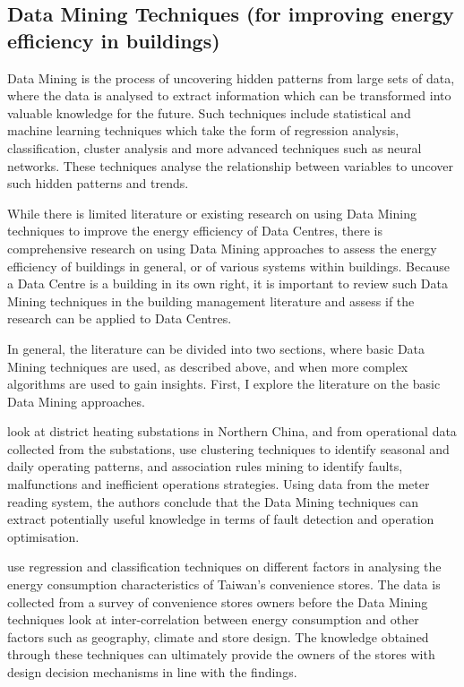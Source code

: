 \documentclass[12pt]{scrartcl}
\begin{document}
\subsection{Data Mining Techniques (for improving energy efficiency in buildings)}  
\label{subsec:[Data Mining Techniques]}
Data Mining is the process of uncovering hidden patterns from large sets of data, where the data is analysed to extract information which can be transformed into valuable knowledge for the future. Such techniques include statistical and machine learning techniques which take the form of regression analysis, classification, cluster analysis and more advanced techniques such as neural networks. These techniques analyse the relationship between variables to uncover such hidden patterns and trends.  

While there is limited literature or existing research on using Data Mining techniques to improve the energy efficiency of Data Centres, there is comprehensive research on using Data Mining approaches to assess the energy efficiency of buildings in general, or of various systems within buildings. Because a Data Centre is a building in its own right, it is important to review such Data Mining techniques in the building management literature and assess if the research can be applied to Data Centres.   

In general, the literature can be divided into two sections, where basic Data Mining techniques are used, as described above, and when more complex algorithms are used to gain insights. First, I explore the literature on the basic Data Mining approaches.
 
\citet{XUE2017926} look at district heating substations in Northern China, and from operational data collected from the substations, use clustering techniques to identify seasonal and daily operating patterns, and association rules mining to identify faults, malfunctions and inefficient operations strategies. Using data from the meter reading system, the authors conclude that the Data Mining techniques can extract potentially useful knowledge in terms of fault detection and operation optimisation. 

\citet{JEFFREYKUO2018120} use regression and classification techniques on different factors in analysing the energy consumption characteristics of Taiwan's convenience stores. The data is collected from a survey of convenience stores owners before the Data Mining techniques look at inter-correlation between energy consumption and other factors such as geography, climate and store design. The knowledge obtained through these techniques can ultimately provide the owners of the stores with design decision mechanisms in line with the findings.  
\end{document}
